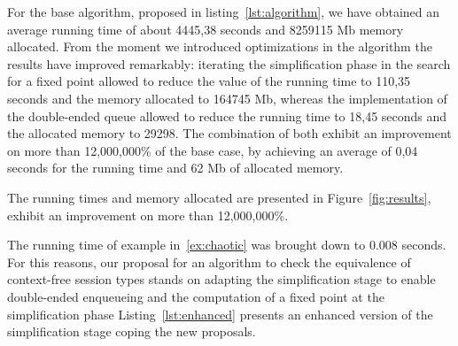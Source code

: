 For the base algorithm, proposed in listing~\ref{lst:algorithm},
we have obtained an average running time of about 4445,38 seconds
and 8259115 Mb memory allocated. From the moment we introduced
optimizations in the algorithm the results have improved remarkably:
iterating the simplification phase in the search for a fixed point
allowed to reduce the value of the running time to 110,35 seconds and
the memory allocated to 164745 Mb, whereas the implementation of the
double-ended queue allowed to reduce the running time to 18,45 seconds
and the allocated memory to 29298. The combination of both exhibit an
improvement on more than 12,000,000\% of the base case, by
achieving an average of 0,04 seconds for the running time and 62 Mb
of allocated memory.

The running times and memory allocated are presented in
Figure~\ref{fig:results}, exhibit an improvement on more than
12,000,000\%.

The running time of example in~\eqref{ex:chaotic} was
brought down to 0.008 seconds. For this reasons, our
proposal for an algorithm to check the equivalence of context-free
session types stands on adapting the simplification stage to enable
double-ended enqueueing and the computation of a fixed point at the
simplification phase Listing~\ref{lst:enhanced} presents an enhanced
version of the simplification stage coping the new proposals.

